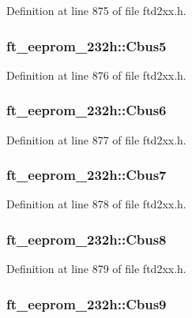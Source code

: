 Definition at line 875 of file ftd2xx.h.\hypertarget{structft__eeprom__232h_ad90423b70af5820736e9da55335c54c2}{
\subsubsection[{Cbus5}]{ {\bf ft\_\-eeprom\_\-232h::Cbus5}}}
\label{structft__eeprom__232h_ad90423b70af5820736e9da55335c54c2}


Definition at line 876 of file ftd2xx.h.\hypertarget{structft__eeprom__232h_aef814f4e06e21a78bddcf36d4ef4eda6}{
\subsubsection[{Cbus6}]{ {\bf ft\_\-eeprom\_\-232h::Cbus6}}}
\label{structft__eeprom__232h_aef814f4e06e21a78bddcf36d4ef4eda6}


Definition at line 877 of file ftd2xx.h.\hypertarget{structft__eeprom__232h_aadc831e39e9fccc0e6fc96d090a9bd8d}{
\subsubsection[{Cbus7}]{ {\bf ft\_\-eeprom\_\-232h::Cbus7}}}
\label{structft__eeprom__232h_aadc831e39e9fccc0e6fc96d090a9bd8d}


Definition at line 878 of file ftd2xx.h.\hypertarget{structft__eeprom__232h_a4a05e570dda1b72a54e653264463436f}{
\subsubsection[{Cbus8}]{ {\bf ft\_\-eeprom\_\-232h::Cbus8}}}
\label{structft__eeprom__232h_a4a05e570dda1b72a54e653264463436f}


Definition at line 879 of file ftd2xx.h.\hypertarget{structft__eeprom__232h_ad995bc87428214d21c0c962cc4cc4e34}{
\subsubsection[{Cbus9}]{ {\bf ft\_\-eeprom\_\-232h::Cbus9}}}
\label{structft__eeprom__232h_ad995bc87428214d21c0c962cc4cc4e34}


